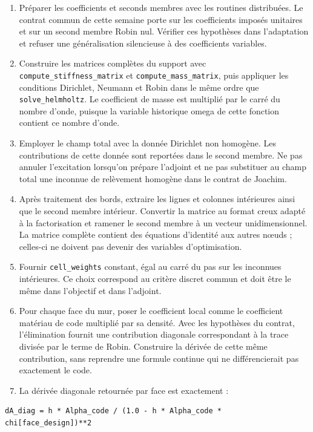 \documentclass[11pt,a4paper]{article}
\begin{document}
\begin{enumerate}
\item Préparer les coefficients et seconds membres avec les routines distribuées. Le contrat commun de cette semaine porte sur les coefficients imposés unitaires et sur un second membre Robin nul. Vérifier ces hypothèses dans l'adaptation et refuser une généralisation silencieuse à des coefficients variables.
\item Construire les matrices complètes du support avec {\small\ttfamily \nolinkurl{compute_stiffness_matrix}} et {\small\ttfamily \nolinkurl{compute_mass_matrix}}, puis appliquer les conditions Dirichlet, Neumann et Robin dans le même ordre que {\small\ttfamily \nolinkurl{solve_helmholtz}}. Le coefficient de masse est multiplié par le carré du nombre d'onde, puisque la variable historique {\small\ttfamily omega} de cette fonction contient ce nombre d'onde.
\item Employer le champ total avec la donnée Dirichlet non homogène. Les contributions de cette donnée sont reportées dans le second membre. Ne pas annuler l'excitation lorsqu'on prépare l'adjoint et ne pas substituer au champ total une inconnue de relèvement homogène dans le contrat de Joachim.
\item Après traitement des bords, extraire les lignes et colonnes intérieures ainsi que le second membre intérieur. Convertir la matrice au format creux adapté à la factorisation et ramener le second membre à un vecteur unidimensionnel. La matrice complète contient des équations d'identité aux autres nœuds ; celles-ci ne doivent pas devenir des variables d'optimisation.
\item Fournir {\small\ttfamily \nolinkurl{cell_weights}} constant, égal au carré du pas sur les inconnues intérieures. Ce choix correspond au critère discret commun et doit être le même dans l'objectif et dans l'adjoint.
\item Pour chaque face du mur, poser le coefficient local comme le coefficient matériau de code multiplié par sa densité. Avec les hypothèses du contrat, l'élimination fournit une contribution diagonale correspondant à la trace divisée par le terme de Robin. Construire la dérivée de cette même contribution, sans reprendre une formule continue qui ne différencierait pas exactement le code.
\item La dérivée diagonale retournée par face est exactement :
\end{enumerate}

\begin{Verbatim}[breaklines,breakanywhere,fontsize=\footnotesize]
   dA_diag = h * Alpha_code / (1.0 - h * Alpha_code * chi[face_design])**2
\end{Verbatim}
\end{document}

